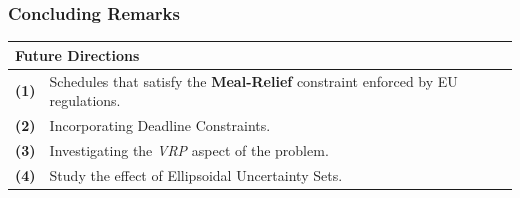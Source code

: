 \documentclass[handout]{beamer}
\begin{document}
\begin{frame}
	\frametitle{Concluding Remarks}
	\vspace{\baselineskip}
	\begin{table}[h]
		\centering
		\begin{tabular}{p{} p{}} 
			\toprule
			\multicolumn{2}{p{0.8\textwidth}}{\textbf{Future Directions}} \\
			\midrule
			\textbf{(1)}       & Schedules that satisfy the \textbf{Meal-Relief} constraint enforced by EU regulations. \\

			\textbf{(2)}       & Incorporating Deadline Constraints. \\
			\textbf{(3)}       & Investigating the \textit{VRP} aspect of the problem. \\
			\textbf{(4)}       & Study the effect of Ellipsoidal Uncertainty Sets. \\
			\bottomrule
		\end{tabular} 
	\end{table}


\end{frame}
 
\end{document}
